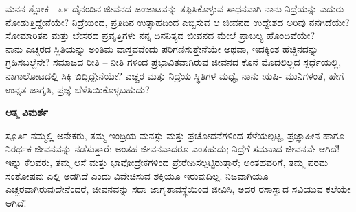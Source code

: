 \begin{mananam}{\mananamfont ಮನನ ಶ್ಲೋಕ - ೬೯}
\small \mananatext ದೈನಂದಿನ ಜೀವನದ ಜಂಜಾಟವನ್ನು ತಪ್ಪಿಸಿಕೊಳ್ಳುವ ಸಾಧನವಾಗಿ ನಾನು ನಿದ್ರೆಯನ್ನು ಎದುರು ನೋಡುತ್ತಿದ್ದೇನೆಯೇ? ನಿದ್ರೆಯಿಂದ, ಪ್ರತಿದಿನ ಉತ್ಸಾಹದಿಂದ ಎಬ್ಬಿಸುವ ಆ  ಜೀವನದ ಉದ್ದೇಶದ ಅರಿವು ನನಗಿದೆಯೇ?  ಸೋಮಾರಿತನ ಮತ್ತು ಬೇಸರದ ಪ್ರವೃತ್ತಿಗಳು ನನ್ನ ದಿನನಿತ್ಯದ ಜೀವನದ ಮೇಲೆ ಪ್ರಾಬಲ್ಯ ಹೊಂದಿವೆಯೇ?\\
ನಾನು ಎಚ್ಚರದ ಸ್ಥಿತಿಯನ್ನು ಅಂತಿಮ ವಾಸ್ತವವೆಂದು ಪರಿಗಣಿಸುತ್ತೇನೆಯೇ ಅಥವಾ, ಇದಕ್ಕಿಂತ ಹೆಚ್ಚಿನದನ್ನು ಗ್ರಹಿಸಬಲ್ಲೆನೇ? ಸಮಾಜದ ರೀತಿ – ನೀತಿ ಗಳಿಂದ ಪ್ರಭಾವಿತವಾಗಿರುವ ಜೀವನದ ಕೊನೆ ಮೊದಲಿಲ್ಲದ ಸ್ಪರ್ಧೆಯಲ್ಲಿ, ನಾಗಾಲೋಟದಲ್ಲಿ ಸಿಕ್ಕಿ ಬಿದ್ದಿದ್ದೇನೆಯೇ? ಎಚ್ಚರ ಮತ್ತು ನಿದ್ರೆಯ  ಸ್ಥಿತಿಗಳ  ಮಧ್ಯೆ,  ನಾನು ಋಷಿ- ಮುನಿಗಳಂತೆ,  ಹೇಗೆ ಉನ್ನತ ಜಾಗೃತಿ, ಪ್ರಜ್ಞೆ ಬೆಳೆಸಿಯಿಕೊಳ್ಳಬಹುದು?

\end{mananam}
\WritingHand\enspace\textbf{ಆತ್ಮ ವಿಮರ್ಶೆ}
\begin{inspiration}{\mananamfont ಸ್ಪೂರ್ತಿ}
\small \mananatext ನಮ್ಮಲ್ಲಿ ಅನೇಕರು, ತಮ್ಮ ಇಂದ್ರಿಯ ಮನಸ್ಸು ಮತ್ತು ಪ್ರಚೋದನೆಗಳಿಂದ ಸೆಳೆಯಲ್ಪಟ್ಟ, ಪ್ರಜ್ಞಾಹೀನ ಹಾಗೂ ನಿರರ್ಥಕ   ಜೀವನವನ್ನು ನಡೆಸುತ್ತಾರೆ; ಅಂತಹ ಜೀವನವಾದರೂ ಎಂತಹುದು; ನಿದ್ರೆಗೆ ಸಮನಾದ ಜೀವನವೇ ಆಗಿದೆ! ಇನ್ನು ಕೆಲವರು, ತಮ್ಮ ಆಸೆ ಮತ್ತು ಭಾವೋದ್ರೇಕಗಳಿಂದ ಪ್ರೇರೇಪಿಸಲ್ಪಟ್ಟಿರುತ್ತಾರೆ; ಅಂತಹವರಿಗೆ, ತಮ್ಮ ಪರಮ ಸಂತೋಷವು ಎಲ್ಲಿ ಅಡಗಿದೆ ಎಂದು ವಿವೇಚಿಸುವ ಶಕ್ತಿಯೂ ಇರುವುದಿಲ್ಲ. ನಿಜವಾಗಿಯೂ ಎಚ್ಚರವಾಗಿರುವುದೇನೆಂದರೆ, ಜೀವನವನ್ನು ಸದಾ ಜಾಗೃತಾವಸ್ಥೆಯಿಂದ ಜೀವಿಸಿ, ಅದರ ರಸಾಸ್ವಾದ  ಸವಿಯುವ ಕಲೆಯೇ ಆಗಿದೆ!
\end{inspiration}
\newpage


